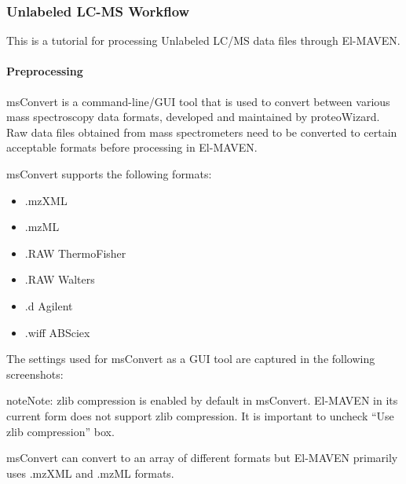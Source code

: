\documentclass[letterpaper,10pt,english,openany,oneside]{sphinxmanual}
\begin{document}
\subsubsection{Unlabeled LC-MS Workflow}
\label{\detokenize{UnlabeledLCMSWorkflow:unlabeled-lc-ms-workflow}}\label{\detokenize{UnlabeledLCMSWorkflow::doc}}
This is a tutorial for processing Unlabeled LC/MS data files through El-MAVEN.


\paragraph{Preprocessing}
\label{\detokenize{UnlabeledLCMSWorkflow:preprocessing}}
msConvert is a command-line/GUI tool that is used to convert between various mass spectroscopy data formats, developed and maintained by proteoWizard. Raw data files obtained from mass spectrometers need to be converted to certain acceptable formats before processing in El-MAVEN.


msConvert supports the following formats:
\begin{itemize}
\item {} 
.mzXML

\item {} 
.mzML

\item {} 
.RAW ThermoFisher

\item {} 
.RAW Walters

\item {} 
.d Agilent

\item {} 
.wiff ABSciex

\end{itemize}

The settings used for msConvert as a GUI tool are captured in the following screenshots:


\begin{sphinxadmonition}{note}{Note:}
zlib compression is enabled by default in msConvert. El-MAVEN in its current form does not support zlib compression. It is important to uncheck “Use zlib compression” box.
\end{sphinxadmonition}


msConvert can convert to an array of different formats but El-MAVEN primarily uses .mzXML and .mzML formats.
\end{document}

